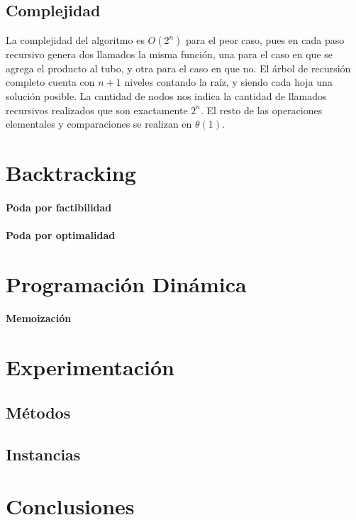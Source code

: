 \documentclass[10pt,a4paper]{article}
\begin{document}
\subsection{Complejidad}
La complejidad del algoritmo es $O(2^n)$ para el peor caso, pues en cada paso recursivo genera dos llamados la misma función, una para el caso en que se agrega el producto al tubo, y otra para el caso en que no. El árbol de recursión completo cuenta con $n + 1$ niveles contando la raíz, y siendo cada hoja una solución posible. La cantidad de nodos nos indica la cantidad de llamados recursivos realizados que son exactamente $2^n$.
El resto de las operaciones elementales y comparaciones se realizan en $\theta(1)$.

\section{Backtracking} \label{sec:backtracking}

\paragraph{Poda por factibilidad}

\paragraph{Poda por optimalidad}

\section{Programación Dinámica} \label{sec:dp}

\paragraph{Memoización}

\section{Experimentación} \label{sec:experimentacion}

\subsection{Métodos}

\subsection{Instancias}


\section{Conclusiones} \label{sec:conclusiones}

\newpage

\end{document}
